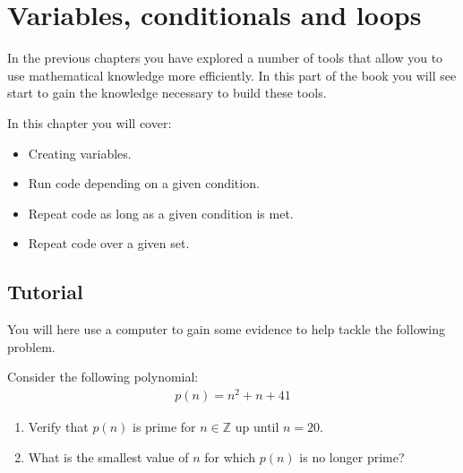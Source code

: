 \chapter{Variables, conditionals and loops}
\label{\detokenize{building-tools/01-variables-conditionals-loops/introduction/main:variables-conditionals-and-loops}}\label{\detokenize{building-tools/01-variables-conditionals-loops/introduction/main::doc}}

In the previous chapters you have explored a number of tools that allow you to use
mathematical knowledge more efficiently. In this part of the book you will
see start to gain the knowledge necessary to build these tools.



\begin{note}
In this chapter you will cover:
\begin{itemize}
\item 

Creating variables.

\item 

Run code depending on a given condition.

\item 

Repeat code as long as a given condition is met.

\item 

Repeat code over a given set.

\end{itemize}
\end{note}





\section{Tutorial}
\label{\detokenize{building-tools/01-variables-conditionals-loops/tutorial/main:tutorial}}\label{\detokenize{building-tools/01-variables-conditionals-loops/tutorial/main::doc}}

You will here use a computer to gain some evidence to help tackle the following
problem.




Consider the following polynomial:
\begin{equation*}
\begin{split}
    p(n) = n ^ 2 + n + 41
\end{split}
\end{equation*}\begin{enumerate}

\item 

Verify that \(p(n)\) is prime for \(n\in \mathbb{Z}\) up until \(n=20\).

\item 

What is the smallest value of \(n\) for which \(p(n)\) is no longer prime?

\end{enumerate}



